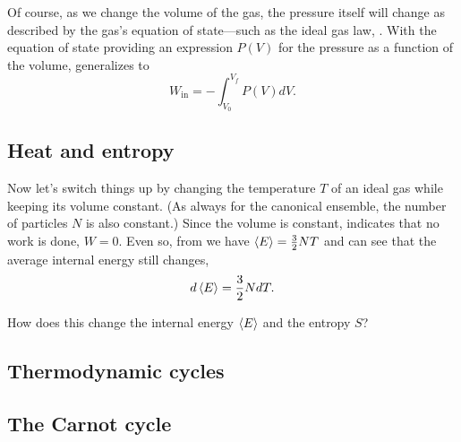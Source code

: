 Of course, as we change the volume of the gas, the pressure itself will change as described by the gas's equation of state---such as the ideal gas law, .
With the equation of state providing an expression $P(V)$ for the pressure as a function of the volume,  generalizes to
\begin{equation}
  \label{eq:work}
  W_{\text{in}} = -\int_{V_0}^{V_f} P(V) dV.
\end{equation}



\subsection{Heat and entropy}
Now let's switch things up by changing the temperature $T$ of an ideal gas while keeping its volume constant.
(As always for the canonical ensemble, the number of particles $N$ is also constant.)
Since the volume is constant,  indicates that no work is done, $W = 0$.
Even so, from  we have $\left\langle E \right\rangle = \frac{3}{2} NT$ and can see that the average internal energy still changes,
\begin{equation}
  d\left\langle E \right\rangle = \frac{3}{2} N dT.
\end{equation}

How does this change the internal energy $\left\langle E \right\rangle$ and the entropy $S$?





\newpage %
\subsection{Thermodynamic cycles}



\newpage %
\subsection{The Carnot cycle}
